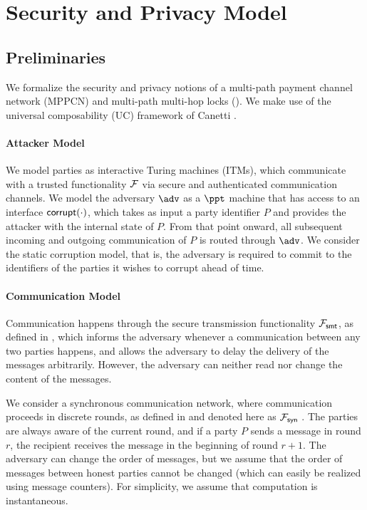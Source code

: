 \section{Security and Privacy Model}
\label{sec:security-model}

\subsection{Preliminaries}
\label{sec:model-prelims}

We formalize the security and privacy notions of a multi-path payment channel network (MPPCN) 
and multi-path multi-hop locks (\sysname). We make use of the universal composability (UC) 
framework of Canetti \cite{canetti}.

\paragraph{Attacker Model}
We model parties as interactive Turing machines (ITMs), which communicate with a trusted 
functionality $\mathcal{F}$ via secure and authenticated communication channels. We model the 
adversary $\adv$  as a $\ppt$ machine that has access to an interface $\mathsf{corrupt}(\cdot)$, 
which takes as input a party identifier $P$ and provides the attacker with the internal 
state of $P$. From that point onward, all subsequent incoming and outgoing communication 
of $P$ is routed through $\adv$. We consider the static corruption model, that is, the 
adversary is required to commit to the identifiers of the parties it wishes to corrupt 
ahead of time.

\paragraph{Communication Model}
Communication happens through the secure transmission functionality $\mathcal{F}_{\mathsf{smt}}$, as 
defined in \cite{canetti}, which informs the adversary whenever a communication between 
any two parties happens, and allows the adversary to delay the delivery of the messages 
arbitrarily. However, the adversary can neither read nor change the content of the messages.

We consider a synchronous communication network, where communication proceeds in discrete 
rounds, as defined in \cite{kmtz} and denoted here as $\mathcal{F}_{\mathsf{syn}}$ . The parties are 
always aware of the current round, and if a party $P$ sends a message in round $r$, 
the recipient receives the message in the beginning of round $r + 1$. The 
adversary can change the order of messages, but we assume that the order of messages 
between honest parties cannot be changed (which can easily be realized using message 
counters). For simplicity, we assume that computation is instantaneous.

